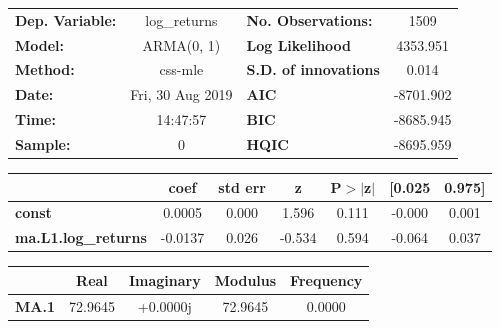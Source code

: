 \begin{center}
\begin{tabular}{lclc}
\toprule
\textbf{Dep. Variable:}     &        log\_returns       & \textbf{  No. Observations:  } &            1509            \\
\textbf{Model:}             &         ARMA(0, 1)        & \textbf{  Log Likelihood     } &          4353.951          \\
\textbf{Method:}            &          css-mle          & \textbf{  S.D. of innovations} &           0.014            \\
\textbf{Date:}              &      Fri, 30 Aug 2019     & \textbf{  AIC                } &         -8701.902          \\
\textbf{Time:}              &          14:47:57         & \textbf{  BIC                } &         -8685.945          \\
\textbf{Sample:}            &             0             & \textbf{  HQIC               } &         -8695.959          \\
\bottomrule
\end{tabular}
\begin{tabular}{lcccccc}
                            & \textbf{coef} & \textbf{std err} & \textbf{z} & \textbf{P$> |$z$|$} & \textbf{[0.025} & \textbf{0.975]}  \\
\midrule
\textbf{const}              &       0.0005  &        0.000     &     1.596  &         0.111        &       -0.000    &        0.001     \\
\textbf{ma.L1.log\_returns} &      -0.0137  &        0.026     &    -0.534  &         0.594        &       -0.064    &        0.037     \\
\bottomrule
\end{tabular}
\begin{tabular}{lcccc}
              & \textbf{            Real} & \textbf{         Imaginary} & \textbf{         Modulus} & \textbf{        Frequency}  \\
\midrule
\textbf{MA.1} &               72.9645     &                +0.0000j     &               72.9645     &                0.0000       \\
\bottomrule
\end{tabular}
\end{center}
